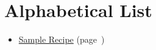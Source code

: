 \chapter*{Alphabetical List}
\begin{itemize}
  \item \hyperref[sec:sample_recipe]{Sample Recipe} (page~\pageref{sec:sample_recipe})
\end{itemize}
